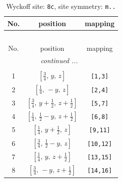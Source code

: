 \documentclass[fleqn,8pt]{jsarticle}
\begin{document}
\begin{longtable}{ccc}
\caption{Wyckoff site: {\tt 8c}, site symmetry: {\tt m..}}
 \\
 \hline \hline
No. & position & mapping \\ \hline \endfirsthead

\multicolumn{2}{l}{\tablename\ \thetable{}} \\
 \hline \hline
No. & position & mapping \\ \hline \endhead

 \hline \hline
\multicolumn{2}{r}{\footnotesize\it continued ...} \\ \endfoot

 \hline \hline
\multicolumn{2}{r}{} \\ \endlastfoot

1 & $\left[ \frac{3}{4},\, y,\, z \right]$ & {\tt [1,3]} \\ \hline
2 & $\left[ \frac{1}{4},\, - y,\, z \right]$ & {\tt [2,4]} \\ \hline
3 & $\left[ \frac{3}{4},\, y + \frac{1}{2},\, z + \frac{1}{2} \right]$ & {\tt [5,7]} \\ \hline
4 & $\left[ \frac{1}{4},\, \frac{1}{2} - y,\, z + \frac{1}{2} \right]$ & {\tt [6,8]} \\ \hline
5 & $\left[ \frac{1}{4},\, y + \frac{1}{2},\, z \right]$ & {\tt [9,11]} \\ \hline
6 & $\left[ \frac{3}{4},\, \frac{1}{2} - y,\, z \right]$ & {\tt [10,12]} \\ \hline
7 & $\left[ \frac{1}{4},\, y,\, z + \frac{1}{2} \right]$ & {\tt [13,15]} \\ \hline
8 & $\left[ \frac{3}{4},\, - y,\, z + \frac{1}{2} \right]$ & {\tt [14,16]} \\
\end{longtable}
\renewcommand{\arraystretch}{1.2}
\end{document}
